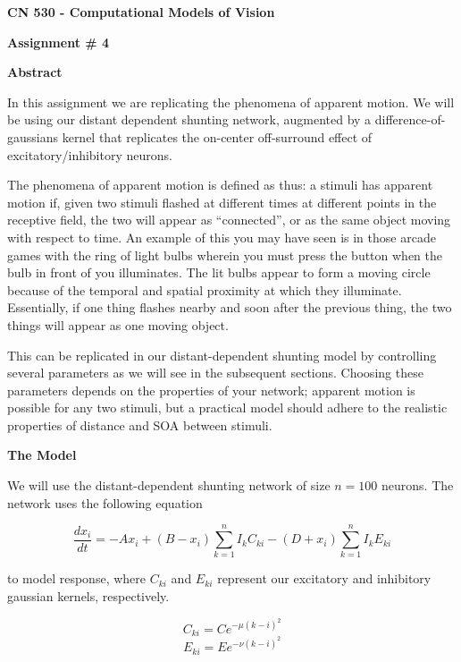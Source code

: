 \documentclass[a4paper,12pt]{article}
\begin{document}
\begin{center}

{\Large\bf CN 530 - Computational Models of Vision}

\bigskip

{\large\bf Assignment \# 4}
\vspace{0.1mm}

\end{center}

{\bf Abstract}
\smallskip

In this assignment we are replicating the phenomena of apparent motion. We will be using our distant dependent shunting network, augmented by a difference-of-gaussians kernel that replicates the on-center off-surround effect of excitatory/inhibitory neurons. 
\smallskip

The phenomena of apparent motion is defined as thus: a stimuli has apparent motion if, given two stimuli flashed at different times at different points in the receptive field, the two will appear as ``connected'', or as the same object moving with respect to time. An example of this you may have seen is in those arcade games with the ring of light bulbs wherein you must press the button when the bulb in front of you illuminates. The lit bulbs appear to form a moving circle because of the temporal and spatial proximity at which they illuminate. Essentially, if one thing flashes nearby and soon after the previous thing, the two things will appear as one moving object. 
\smallskip

This can be replicated in our distant-dependent shunting model by controlling several parameters as we will see in the subsequent sections. Choosing these parameters depends on the properties of your network; apparent motion is possible for any two stimuli, but a practical model should adhere to the realistic properties of distance and SOA between stimuli. 
\vfil\eject

{\bf The Model}
\smallskip

We will use the distant-dependent shunting network of size $n=100$ neurons. The network uses the following equation 

\begin{equation}
\frac{dx_i}{dt}=-Ax_i+(B-x_i) \sum_{k=1}^nI_kC_{ki}-(D+x_i) \sum_{k=1}^nI_kE_{ki}
\end{equation}

to model response, where $C_{ki}$ and $E_{ki}$ represent our excitatory and inhibitory gaussian kernels, respectively. 

\begin{equation}
C_{ki}=Ce^{-\mu(k-i)^2}
\end{equation}
\begin{equation}
E_{ki}=Ee^{-\nu(k-i)^2}
\end{equation}
\bigskip
\end{document}
